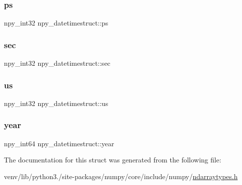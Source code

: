 \subsubsection{\texorpdfstring{ps}{ps}}
{\footnotesize\ttfamily npy\+\_\+int32 npy\+\_\+datetimestruct\+::ps}

\mbox{\label{structnpy__datetimestruct_a0edb35e46eba4fdeb241c980933474b9}} 
\subsubsection{\texorpdfstring{sec}{sec}}
{\footnotesize\ttfamily npy\+\_\+int32 npy\+\_\+datetimestruct\+::sec}

\mbox{\label{structnpy__datetimestruct_a41baa454b6ef074faacb2ce2dc302a8f}} 
\subsubsection{\texorpdfstring{us}{us}}
{\footnotesize\ttfamily npy\+\_\+int32 npy\+\_\+datetimestruct\+::us}

\mbox{\label{structnpy__datetimestruct_af6d1283c07f9b8e459ebb152b45575b5}} 
\subsubsection{\texorpdfstring{year}{year}}
{\footnotesize\ttfamily npy\+\_\+int64 npy\+\_\+datetimestruct\+::year}



The documentation for this struct was generated from the following file\+:\begin{DoxyCompactItemize}
\item 
venv/lib/python3./site-\/packages/numpy/core/include/numpy/\hyperlink{ndarraytypes_8h}{ndarraytypes.\+h}\end{DoxyCompactItemize}
